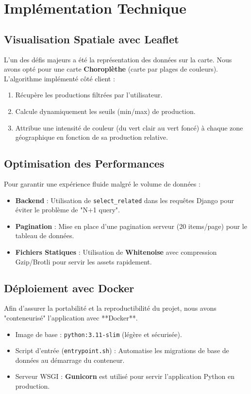 \documentclass[a4paper,12pt]{report}
\begin{document}
\chapter{Implémentation Technique}

\section{Visualisation Spatiale avec Leaflet}
L'un des défis majeurs a été la représentation des données sur la carte. Nous avons opté pour une carte \textbf{Choroplèthe} (carte par plages de couleurs).
L'algorithme implémenté côté client :
\begin{enumerate}
    \item Récupère les productions filtrées par l'utilisateur.
    \item Calcule dynamiquement les seuils (min/max) de production.
    \item Attribue une intensité de couleur (du vert clair au vert foncé) à chaque zone géographique en fonction de sa production relative.
\end{enumerate}

\section{Optimisation des Performances}
Pour garantir une expérience fluide malgré le volume de données :
\begin{itemize}
    \item \textbf{Backend} : Utilisation de \texttt{select\_related} dans les requêtes Django pour éviter le problème de "N+1 query".
    \item \textbf{Pagination} : Mise en place d'une pagination serveur (20 items/page) pour le tableau de données.
    \item \textbf{Fichiers Statiques} : Utilisation de \textbf{Whitenoise} avec compression Gzip/Brotli pour servir les assets rapidement.
\end{itemize}

\section{Déploiement avec Docker}
Afin d'assurer la portabilité et la reproductibilité du projet, nous avons "conteneurisé" l'application avec **Docker**.
\begin{itemize}
    \item Image de base : \texttt{python:3.11-slim} (légère et sécurisée).
    \item Script d'entrée (\texttt{entrypoint.sh}) : Automatise les migrations de base de données au démarrage du conteneur.
    \item Serveur WSGI : \textbf{Gunicorn} est utilisé pour servir l'application Python en production.
\end{itemize}
\end{document}
